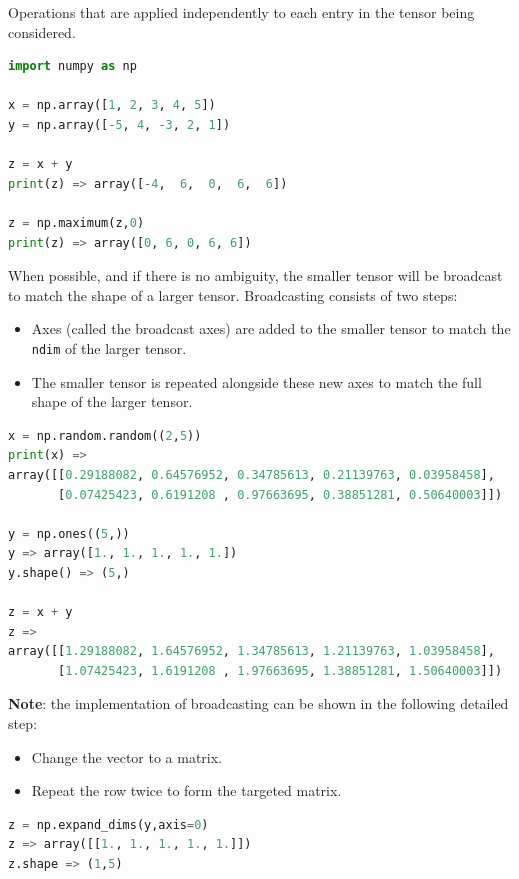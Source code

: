 {Operations that are applied independently to each entry in the tensor being considered.

\vs
\begin{lstlisting}[language=python, breaklines=true]
import numpy as np

x = np.array([1, 2, 3, 4, 5])
y = np.array([-5, 4, -3, 2, 1])

z = x + y
print(z) => array([-4,  6,  0,  6,  6])

z = np.maximum(z,0)
print(z) => array([0, 6, 0, 6, 6])
\end{lstlisting}


When possible, and if there is no ambiguity, the smaller tensor will be broadcast to match the shape of a larger tensor. Broadcasting consists of two steps:
\begin{itemize}
    \item Axes (called the broadcast axes) are added to the smaller tensor to match the \texttt{ndim} of the larger tensor.
    \item The smaller tensor is repeated alongside these new axes to match the full shape of the larger tensor.
\end{itemize}
\vs

\begin{lstlisting}[language=python, breaklines=true]
x = np.random.random((2,5))
print(x) =>
array([[0.29188082, 0.64576952, 0.34785613, 0.21139763, 0.03958458],
       [0.07425423, 0.6191208 , 0.97663695, 0.38851281, 0.50640003]])

y = np.ones((5,))
y => array([1., 1., 1., 1., 1.])
y.shape() => (5,)

z = x + y
z => 
array([[1.29188082, 1.64576952, 1.34785613, 1.21139763, 1.03958458],
       [1.07425423, 1.6191208 , 1.97663695, 1.38851281, 1.50640003]])
\end{lstlisting}
\vs

\textbf{Note}: the implementation of broadcasting can be shown in the following detailed step:
\begin{itemize}
    \item Change the vector to a matrix.
    \item Repeat the row twice to form the targeted matrix.
\end{itemize}

\vs
\begin{lstlisting}[language=python, breaklines=true]
z = np.expand_dims(y,axis=0)
z => array([[1., 1., 1., 1., 1.]])
z.shape => (1,5)


\end{lstlisting}}
